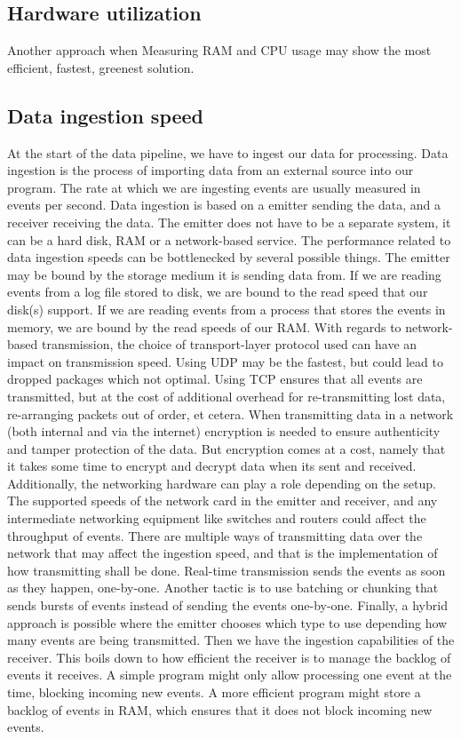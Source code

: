 \subsection{Hardware utilization}
\label{sub:hardware-utilization}
Another approach when 
Measuring RAM and CPU usage may show the most efficient, fastest, greenest solution.

\subsection{Data ingestion speed}
\label{sub:ingestion-speed}

At the start of the data pipeline, we have to ingest our data for processing. Data ingestion is the process of importing data from an external source into our program. The rate at which we are ingesting events are usually measured in events per second.
Data ingestion is based on a emitter sending the data, and a receiver receiving the data. The emitter does not have to be a separate system, it can be a hard disk, RAM or a network-based service. 
The performance related to data ingestion speeds can be bottlenecked by several possible things. The emitter may be bound by the storage medium it is sending data from. If we are reading events from a log file stored to disk, we are bound to the read speed that our disk(s) support. If we are reading events from a process that stores the events in memory, we are bound by the read speeds of our RAM.
With regards to network-based transmission, the choice of transport-layer protocol used can have an impact on transmission speed. Using UDP may be the fastest, but could lead to dropped packages which not optimal. Using TCP ensures that all events are transmitted, but at the cost of additional overhead for re-transmitting lost data, re-arranging packets out of order, et cetera. When transmitting data in a network (both internal and via the internet) encryption is needed to ensure authenticity and tamper protection of the data. But encryption comes at a cost, namely that it takes some time to encrypt and decrypt data when its sent and received.
Additionally, the networking hardware can play a role depending on the setup. The supported speeds of the network card in the emitter and receiver, and any intermediate networking equipment like switches and routers could affect the throughput of events.
There are multiple ways of transmitting data over the network that may affect the ingestion speed, and that is the implementation of how transmitting shall be done. Real-time transmission sends the events as soon as they happen, one-by-one. Another tactic is to use batching or chunking that sends bursts of events instead of sending the events one-by-one. Finally, a hybrid approach is possible where the emitter chooses which type to use depending how many events are being transmitted.
Then we have the ingestion capabilities of the receiver. This boils down to how efficient the receiver is to manage the backlog of events it receives. A simple program might only allow processing one event at the time, blocking incoming new events. A more efficient program might store a backlog of events in RAM, which ensures that it does not block incoming new events.

